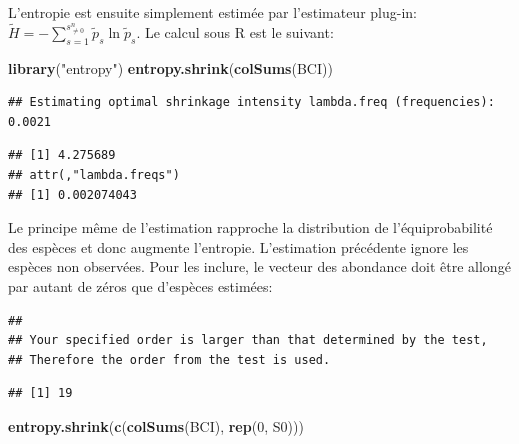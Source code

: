 \documentclass[
  11pt,
  french,
  a4paper,
  extrafontsizes,onecolumn,openright
  ]{memoir}
\newenvironment{Shaded}{\begin{snugshade}}{\end{snugshade}}
\newcommand{\DecValTok}[1]{\textcolor[rgb]{0.00,0.00,0.81}{#1}}
\newcommand{\KeywordTok}[1]{\textcolor[rgb]{0.13,0.29,0.53}{\textbf{#1}}}
\newcommand{\NormalTok}[1]{#1}
\newcommand{\OperatorTok}[1]{\textcolor[rgb]{0.81,0.36,0.00}{\textbf{#1}}}
\newcommand{\StringTok}[1]{\textcolor[rgb]{0.31,0.60,0.02}{#1}}
\begin{document}
L'entropie est ensuite simplement estimée par l'estimateur plug-in: \(\tilde{H} = -\sum^{s^{n}_{\ne 0}}_{s=1}{\tilde{p}_s \ln{\tilde{p}_s}}\).
Le calcul sous R est le suivant:

\scriptsize

\begin{Shaded}
\begin{Highlighting}[]
\KeywordTok{library}\NormalTok{(}\StringTok{"entropy"}\NormalTok{)}
\KeywordTok{entropy.shrink}\NormalTok{(}\KeywordTok{colSums}\NormalTok{(BCI))}
\end{Highlighting}
\end{Shaded}

\begin{verbatim}
## Estimating optimal shrinkage intensity lambda.freq (frequencies): 0.0021
\end{verbatim}

\begin{verbatim}
## [1] 4.275689
## attr(,"lambda.freqs")
## [1] 0.002074043
\end{verbatim}

\normalsize

Le principe même de l'estimation rapproche la distribution de l'équiprobabilité des espèces et donc augmente l'entropie.
L'estimation précédente ignore les espèces non observées.
Pour les inclure, le vecteur des abondance doit être allongé par autant de zéros que d'espèces estimées:

\scriptsize

\begin{Shaded}
\end{Shaded}

\begin{verbatim}
## 
## Your specified order is larger than that determined by the test, 
## Therefore the order from the test is used.
\end{verbatim}

\begin{verbatim}
## [1] 19
\end{verbatim}

\begin{Shaded}
\begin{Highlighting}[]
\KeywordTok{entropy.shrink}\NormalTok{(}\KeywordTok{c}\NormalTok{(}\KeywordTok{colSums}\NormalTok{(BCI), }\KeywordTok{rep}\NormalTok{(}\DecValTok{0}\NormalTok{, S0)))}
\end{Highlighting}
\end{Shaded}
\end{document}
